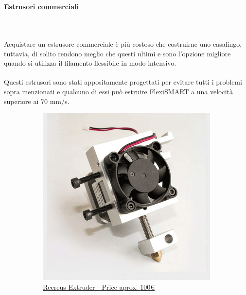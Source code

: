 \documentclass[11pt,a4paper]{article}
\begin{document}
			\paragraph{Estrusori commerciali}\mbox{}\\\\
Acquistare un estrusore commerciale è più costoso che costruirne uno casalingo, tuttavia, di solito rendono meglio che questi ultimi e sono l'opzione migliore quando si utilizza il filamento flessibile in modo intensivo.
\\\\
Questi estrusori sono stati appositamente progettati per evitare tutti i problemi sopra menzionati e qualcuno di essi può estruire FlexiSMART a una velocità superiore ai 70 mm/s.
\begin{figure}[H]
    \centering
    \begin{subfigure}[b]{0.4\textwidth}
        \includegraphics[width=\textwidth,cfbox=azul_marcos 4pt 0pt]{FOTOS/EXTRUSOR5}
		\caption*{\href{http://www.recreus.com}{{\footnotesize Recreus Extruder - Price aprox. 100\euro}}}
    \end{subfigure}
    ~ \qquad%
    \begin{subfigure}[b]{0.4\textwidth}

\end{subfigure}
\end{figure}
\end{document}
